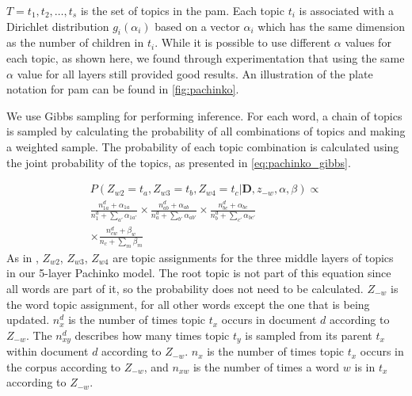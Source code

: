 $T = {t_1, t_2, \dots, t_s}$ is the set of topics in the \gls{pam}. 
Each topic $t_i$ is associated with a Dirichlet distribution $g_i(\alpha_i)$ based on a vector $\alpha_i$ which has the same dimension as the number of children in $t_i$.
While it is possible to use different $\alpha$ values for each topic, as shown here, we found through experimentation that using the same $\alpha$ value for all layers still provided good results.
An illustration of the plate notation for \gls{pam} can be found in \autoref{fig:pachinko}.

We use Gibbs sampling for performing inference.
For each word, a chain of topics is sampled by calculating the probability of all combinations of topics and making a weighted sample.
The probability of each topic combination is calculated using the joint probability of the topics, as presented in \autoref{eq:pachinko_gibbs}.

\begin{equation}\label{eq:pachinko_gibbs}
	\begin{split}
		P(Z_{w2} = t_a, Z_{w3} = t_b, Z_{w4} = t_c | \textbf{D}, z_{-w}, \alpha, \beta) \propto \\
		\frac{n_{1a}^d + \alpha_{1a}}{n_1^d + \sum_{a'} \alpha_{1a'}} \times
		\frac{n_{ab}^d + \alpha_{ab}}{n_a^d + \sum_{b'} \alpha_{ab'}}  \times 
		\frac{n_{bc}^d + \alpha_{bc}}{n_{b}^d + \sum_{c'} \alpha_{bc'}} \\ \times 
		\frac{n_{cw}^d + \beta_{w}}{n_{c} + \sum_{m} \beta_{m}} 
	\end{split}
\end{equation}
As in \citet{li2006pachinko}, $Z_{w2}$, $Z_{w3}$, $Z_{w4}$ are topic assignments for the three middle layers of topics in our 5-layer Pachinko model.
The root topic is not part of this equation since all words are part of it, so the probability does not need to be calculated.
$Z_{-w}$ is the word topic assignment, for all other words except the one that is being updated.
$n_x^d$ is the number of times topic $t_x$ occurs in document $d$ according to $Z_{-w}$. 
The $n_{xy}^d$ describes how many times topic $t_y$ is sampled from its parent $t_x$ within document $d$ according to $Z_{-w}$.
$n_x$ is the number of times topic $t_x$ occurs in the corpus according to $Z_{-w}$, and $n_{xw}$ is the number of times a word $w$ is in $t_x$ according to $Z_{-w}$.





